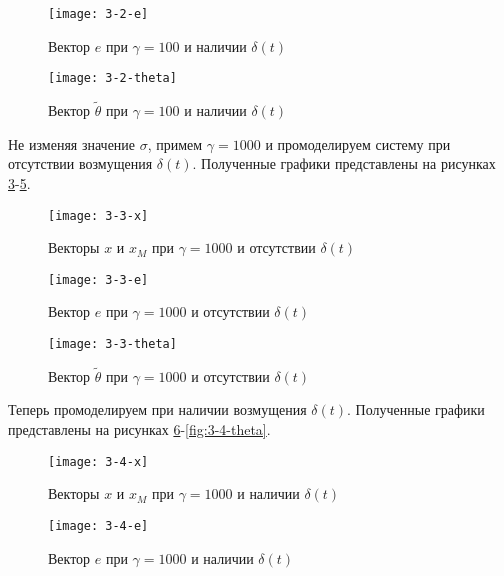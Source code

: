 \documentclass[14pt, a4paper]{extarticle}
\begin{document}
\begin{enumerate}
		\begin{figure}[H]
			\centering
			\texttt{[image: 3-2-e]}
			\caption{Вектор $e$ при $\gamma=100$ и наличии $\delta(t)$}
			\label{fig:3-2-e}
		\end{figure}
		
		\begin{figure}[H]
			\centering
			\texttt{[image: 3-2-theta]}
			\caption{Вектор $\tilde{\theta}$ при $\gamma=100$ и наличии $\delta(t)$}
			\label{fig:3-2-theta}
		\end{figure}
		
		Не изменяя значение $\sigma$, примем $\gamma=1000$ и промоделируем систему при отсутствии возмущения $\delta(t)$. Полученные графики представлены на рисунках \ref{fig:3-3-x}-\ref{fig:3-3-theta}.
		
		\begin{figure}[H]
			\centering
			\texttt{[image: 3-3-x]}
			\caption{Векторы $x$ и $x_M$ при $\gamma=1000$ и отсутствии $\delta(t)$}
			\label{fig:3-3-x}
		\end{figure}
		
		\begin{figure}[H]
			\centering
			\texttt{[image: 3-3-e]}
			\caption{Вектор $e$ при $\gamma=1000$ и отсутствии $\delta(t)$}
			\label{fig:3-3-e}
		\end{figure}
		
		\begin{figure}[H]
			\centering
			\texttt{[image: 3-3-theta]}
			\caption{Вектор $\tilde{\theta}$ при $\gamma=1000$ и отсутствии $\delta(t)$}
			\label{fig:3-3-theta}
		\end{figure}
		
		Теперь промоделируем при наличии возмущения $\delta(t)$. Полученные графики представлены на рисунках \ref{fig:3-4-x}-\ref{fig:3-4-theta}.
		
		\begin{figure}[H]
			\centering
			\texttt{[image: 3-4-x]}
			\caption{Векторы $x$ и $x_M$ при $\gamma=1000$ и наличии $\delta(t)$}
			\label{fig:3-4-x}
		\end{figure}
		
		\begin{figure}[H]
			\centering
			\texttt{[image: 3-4-e]}
			\caption{Вектор $e$ при $\gamma=1000$ и наличии $\delta(t)$}
			\label{fig:3-4-e}
		\end{figure}
		

\end{enumerate}
\end{document}
